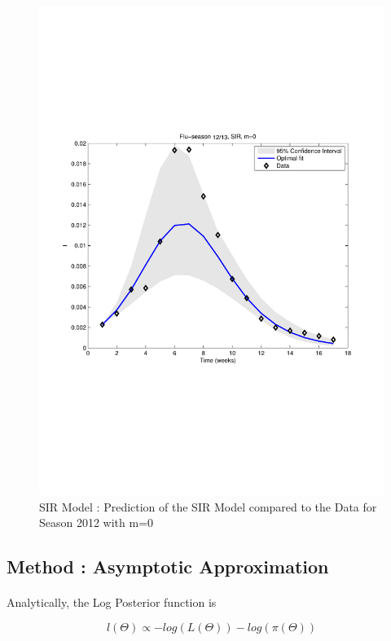 \documentclass[11pt, a4paper]{article}
\begin{document}
\begin{figure}[h]
    \includegraphics[height = 0.25\textheight]{figures/SIR_prediction_season3_m=0.pdf}
    \caption{SIR Model : Prediction of the SIR Model compared to the Data for Season 2012 with m=0}
    \label{fig:sir0_pred3}
\end{figure}

\subsection{Method : Asymptotic Approximation}
\paragraph{}
Analytically, the Log Posterior function is 

\begin{equation}
l(\Theta) \propto - log(L(\Theta)) - log(\pi(\Theta))
\end{equation}
\end{document}

